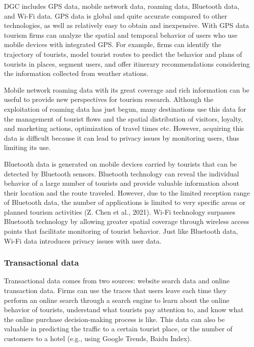 \documentclass[
  letterpaper,
  DIV=11,
  numbers=noendperiod]{scrreprt}
\begin{document}
DGC includes GPS data, mobile network data, roaming data, Bluetooth
data, and Wi-Fi data. GPS data is global and quite accurate compared to
other technologies, as well as relatively easy to obtain and
inexpensive. With GPS data tourism firms can analyze the spatial and
temporal behavior of users who use mobile devices with integrated GPS.
For example, firms can identify the trajectory of tourists, model
tourist routes to predict the behavior and plans of tourists in places,
segment users, and offer itinerary recommendations considering the
information collected from weather stations.

Mobile network roaming data with its great coverage and rich information
can be useful to provide new perspectives for tourism research. Although
the exploitation of roaming data has just begun, many destinations use
this data for the management of tourist flows and the spatial
distribution of visitors, loyalty, and marketing actions, optimization
of travel times etc. However, acquiring this data is difficult because
it can lead to privacy issues by monitoring users, thus limiting its
use.

Bluetooth data is generated on mobile devices carried by tourists that
can be detected by Bluetooth sensors. Bluetooth technology can reveal
the individual behavior of a large number of tourists and provide
valuable information about their location and the route traveled.
However, due to the limited reception range of Bluetooth data, the
number of applications is limited to very specific areas or planned
tourism activities (Z. Chen et al., 2021). Wi-Fi technology surpasses
Bluetooth technology by allowing greater spatial coverage through
wireless access points that facilitate monitoring of tourist behavior.
Just like Bluetooth data, Wi-Fi data introduces privacy issues with user
data.

\hypertarget{transactional-data}{%
\subsubsection{Transactional data}\label{transactional-data}}

Transactional data comes from two sources: website search data and
online transaction data. Firms can use the traces that users leave each
time they perform an online search through a search engine to learn
about the online behavior of tourists, understand what tourists pay
attention to, and know what the online purchase decision-making process
is like. This data can also be valuable in predicting the traffic to a
certain tourist place, or the number of customers to a hotel (e.g.,
using Google Trends, Baidu Index).
\end{document}
